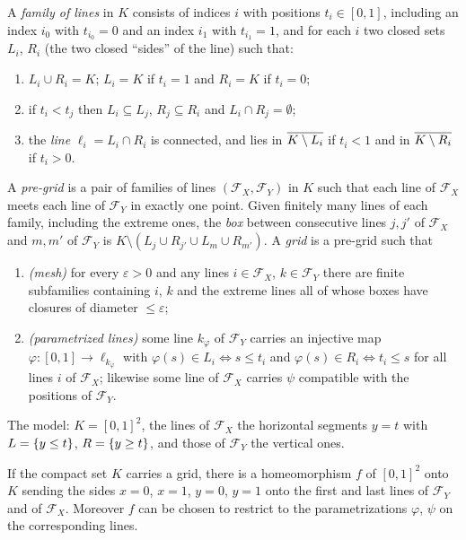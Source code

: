 \begin{definition}\label{def:family-lines}
A \emph{family of lines} in $K$ consists of indices $i$ with positions $t_i\in[0,1]$, including an index $i_0$ with
$t_{i_0}=0$ and an index $i_1$ with $t_{i_1}=1$, and for each $i$ two closed sets $L_i$, $R_i$ (the two closed
``sides'' of the line) such that:
\begin{enumerate}[label=(\arabic*)]
\item $L_i\cup R_i=K$; $L_i=K$ if $t_i=1$ and $R_i=K$ if $t_i=0$;
\item if $t_i<t_j$ then $L_i\subseteq L_j$, $R_j\subseteq R_i$ and $L_i\cap R_j=\emptyset$;
\item the \emph{line} $\ell_i=L_i\cap R_i$ is connected, and lies in $\overline{K\setminus L_i}$ if $t_i<1$ and in $\overline{K\setminus R_i}$ if
$t_i>0$.
\end{enumerate}
A \emph{pre-grid} is a pair of families of lines $(\mathcal F_X,\mathcal F_Y)$ in $K$ such that each line of $\mathcal F_X$ meets
each line of $\mathcal F_Y$ in exactly one point. Given finitely many lines of each family, including the extreme ones, the
\emph{box} between consecutive lines $j,j'$ of $\mathcal F_X$ and $m,m'$ of $\mathcal F_Y$ is $K\setminus(L_j\cup R_{j'}\cup
L_m\cup R_{m'})$. A \emph{grid} is a pre-grid such that
\begin{enumerate}[label=(\arabic*),resume]
\item \emph{(mesh)} for every $\varepsilon>0$ and any lines $i\in\mathcal F_X$, $k\in\mathcal F_Y$ there are finite subfamilies
containing $i$, $k$ and the extreme lines all of whose boxes have closures of diameter $\le\varepsilon$;
\item \emph{(parametrized lines)} some line $k_\varphi$ of $\mathcal F_Y$ carries an injective map $\varphi\colon[0,1]\to\ell_{k_\varphi}$ with
$\varphi(s)\in L_i\iff s\le t_i$ and $\varphi(s)\in R_i\iff t_i\le s$ for all lines $i$ of $\mathcal F_X$; likewise some line of $\mathcal F_X$
carries $\psi$ compatible with the positions of $\mathcal F_Y$.
\end{enumerate}
\end{definition}


The model: $K=[0,1]^2$, the lines of $\mathcal F_X$ the horizontal segments $y=t$ with $L=\left\{ y\le t \right\}$, $R=\left\{ y\ge t \right\}$, and
those of $\mathcal F_Y$ the vertical ones.

\begin{theorem}\label{thm:grid-square}
If the compact set $K$ carries a grid, there is a homeomorphism $f$ of $[0,1]^2$ onto $K$ sending the sides $x=0$, $x=1$,
$y=0$, $y=1$ onto the first and last lines of $\mathcal F_Y$ and of $\mathcal F_X$. Moreover $f$ can be chosen to restrict to
the parametrizations $\varphi$, $\psi$ on the corresponding lines.
\end{theorem}

